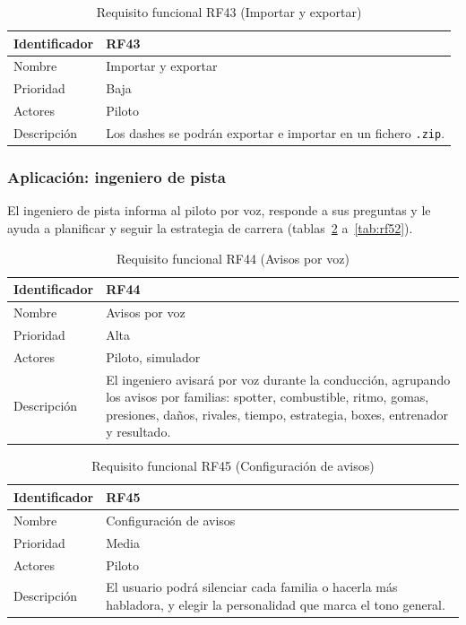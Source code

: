 \begin{table}[H]
	\centering
	\renewcommand{\arraystretch}{2}
	\begin{tabular}{|l|p{10cm}|}
		\hline
		Identificador & RF43 \\
		\hline
		Nombre & Importar y exportar \\
		\hline
		Prioridad & Baja \\
		\hline
		Actores & Piloto \\
		\hline
		Descripción & Los dashes se podrán exportar e importar en un fichero \texttt{.zip}. \\
		\hline
	\end{tabular}
	\caption{Requisito funcional RF43 (Importar y exportar)}
	\label{tab:rf43}
\end{table}

\subsubsection{Aplicación: ingeniero de pista}

El ingeniero de pista informa al piloto por voz, responde a sus preguntas y le ayuda a planificar y seguir la estrategia de carrera (tablas~\ref{tab:rf44} a~\ref{tab:rf52}).

\begin{table}[H]
	\centering
	\renewcommand{\arraystretch}{2}
	\begin{tabular}{|l|p{10cm}|}
		\hline
		Identificador & RF44 \\
		\hline
		Nombre & Avisos por voz \\
		\hline
		Prioridad & Alta \\
		\hline
		Actores & Piloto, simulador \\
		\hline
		Descripción & El ingeniero avisará por voz durante la conducción, agrupando los avisos por familias: spotter, combustible, ritmo, gomas, presiones, daños, rivales, tiempo, estrategia, boxes, entrenador y resultado. \\
		\hline
	\end{tabular}
	\caption{Requisito funcional RF44 (Avisos por voz)}
	\label{tab:rf44}
\end{table}

\begin{table}[H]
	\centering
	\renewcommand{\arraystretch}{2}
	\begin{tabular}{|l|p{10cm}|}
		\hline
		Identificador & RF45 \\
		\hline
		Nombre & Configuración de avisos \\
		\hline
		Prioridad & Media \\
		\hline
		Actores & Piloto \\
		\hline
		Descripción & El usuario podrá silenciar cada familia o hacerla más habladora, y elegir la personalidad que marca el tono general. \\
		\hline
	\end{tabular}
	\caption{Requisito funcional RF45 (Configuración de avisos)}
	\label{tab:rf45}
\end{table}


